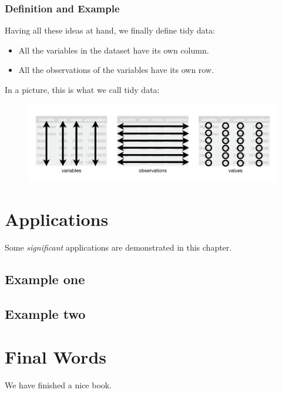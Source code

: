 \documentclass[]{book}
\begin{document}
\subsection{Definition and Example}\label{definition-and-example}

Having all these ideas at hand, we finally define tidy data:

\begin{itemize}
\item
  All the variables in the dataset have its own column.
\item
  All the observations of the variables have its own row.
\end{itemize}

In a picture, this is what we call tidy data:

\begin{figure}
\centering
\includegraphics{images/tidy-1.png}
\caption{}
\end{figure}

\chapter{Applications}\label{applications}

Some \emph{significant} applications are demonstrated in this chapter.

\section{Example one}\label{example-one}

\section{Example two}\label{example-two}

\chapter{Final Words}\label{final-words}

We have finished a nice book.


\end{document}
